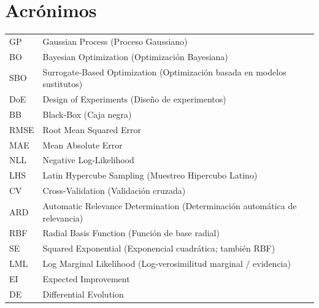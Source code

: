 \chapter*{Acrónimos}

\begin{tabular}{ll}
GP  & Gaussian Process (Proceso Gaussiano) \\
BO  & Bayesian Optimization (Optimización Bayesiana) \\
SBO & Surrogate-Based Optimization (Optimización basada en modelos sustitutos) \\
DoE & Design of Experiments (Diseño de experimentos) \\
BB  & Black-Box (Caja negra) \\
RMSE & Root Mean Squared Error \\
MAE & Mean Absolute Error \\
NLL & Negative Log-Likelihood \\
LHS & Latin Hypercube Sampling (Muestreo Hipercubo Latino) \\
CV & Cross-Validation (Validación cruzada) \\
ARD & Automatic Relevance Determination (Determinación automática de relevancia) \\
RBF & Radial Basis Function (Función de base radial) \\
SE  & Squared Exponential (Exponencial cuadrática; también RBF) \\
LML & Log Marginal Likelihood (Log-verosimilitud marginal / evidencia) \\
EI & Expected Improvement \\
DE & Differential Evolution \\

\end{tabular}

